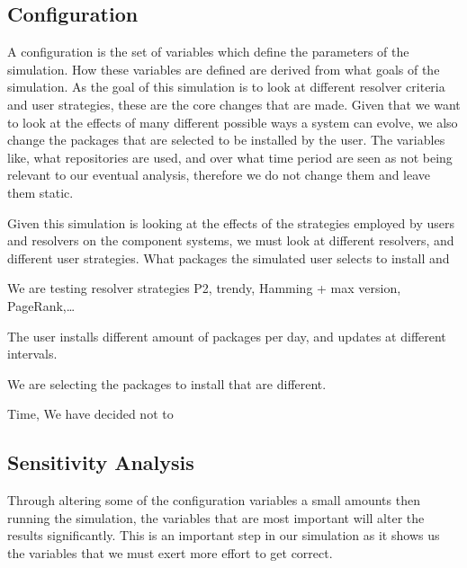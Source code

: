 \subsection{Configuration}
A configuration is the set of variables which define the parameters of the simulation.
How these variables are defined are derived from what goals of the simulation.
As the goal of this simulation is to look at different resolver criteria and user strategies,
these are the core changes that are made.
Given that we want to look at the effects of many different possible ways a system can evolve,
we also change the packages that are selected to be installed by the user.
The variables like, what repositories are used, and over what time period are seen as not being relevant to our eventual analysis,
therefore we do not change them and leave them static.

Given this simulation is looking at the effects of the strategies employed by users and resolvers on the component systems,
we must look at different resolvers, and different user strategies.
What packages the simulated user selects to install and 

We are testing resolver strategies P2, trendy, Hamming + max version, PageRank,\ldots 

The user installs different amount of packages per day, and updates at different intervals. 

We are selecting the packages to install that are different.

Time, We have decided not to 

\subsection{Sensitivity Analysis}
{}Through altering some of the configuration variables a small amounts then running the simulation, the variables that are most important will alter the results significantly.
{}This is an important step in our simulation as it shows us the variables that we must exert more effort to get correct. 


